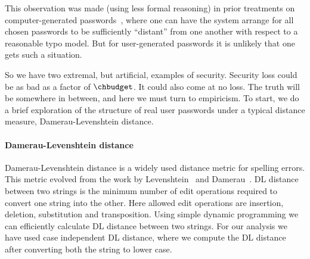 \iffalse
no two neighborhoods overlap,
typo tolerance comes at no security loss. In detail, consider a
distribution $\pwprob$ and typo model $\dist$ such that for any
$\pw,\pw'\in \PW$ with $\pwprob(\pw) > 0$ and $\pwprob(\pw') > 0$
there does not exist a $\pwtypo$ such that both
$\similar_\pw(\pwtypo) >0 $ and $\similar_{\pw'}(\pwtypo)> 0 $.  In
words, this just means that there exist no points in common between the
neighborhood of any $\pw$ and $\pw'$.  Then one can in theory build a
checker that achieves acceptance utility 1 and for which
$\fuzzlambda_q = \lambda_q$ for all~$q$.
\fi

This observation was made (using less formal reasoning) in prior
treatments on computer-generated
passwords~\cite{shay2012correct,techreport}, where one can have the
system arrange for all chosen passwords to be sufficiently ``distant''
from one another with respect to a reasonable typo model. But for
user-generated passwords it is unlikely that one gets such a
situation.

So we have two extremal, but artificial, examples of
security. Security loss could be as bad as a factor of $\chbudget$. It
could also come at no loss. The truth will be somewhere in between,
and here we must turn to empiricism. To start, we do a brief
exploration of the structure of real user passwords under a typical
distance measure, Damerau-Levenshtein distance.


\paragraph{Damerau-Levenshtein distance} Damerau-Levenshtein distance
is a widely used distance metric for spelling errors. This metric
evolved from the work by Levenshtein~\cite{levenshtein1966binary} and
Damerau~\cite{damerau1964technique}.  DL distance between two strings
is the minimum number of edit operations required to convert one
string into the other. Here allowed edit operations are insertion,
deletion, substitution and transposition.  Using simple dynamic
programming we can efficiently calculate DL distance between two
strings.  For our analysis we have used case independent DL distance,
where we compute the DL distance after converting both the string to
lower case.


